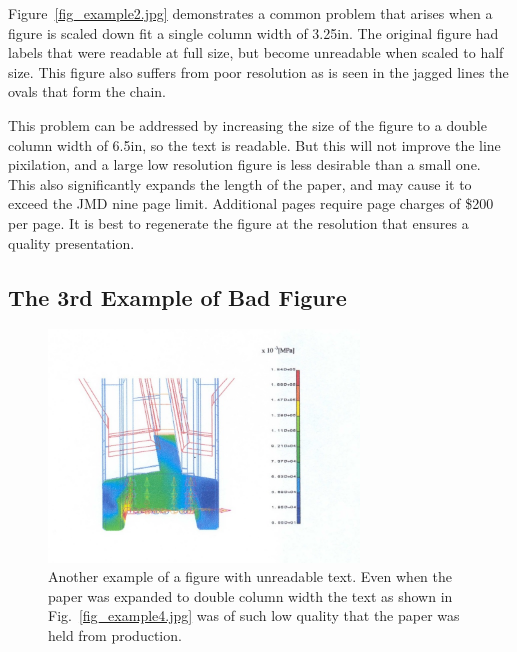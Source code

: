 \documentclass[10pt,cleanfoot]{asme2ej}
\begin{document}
Figure~\ref{fig_example2.jpg}
demonstrates a common problem that arises when a figure is scaled down fit a single column width of 3.25in.  The original figure had labels that were readable at full size, but become unreadable when scaled to half size.  This figure also suffers from poor resolution as is seen in the jagged lines the ovals that form the chain.

This problem can be addressed by increasing the size of the figure to a double column width of 6.5in, so the text is readable.  But this will not improve the line pixilation, and a large low resolution figure is less desirable than a small one.  This also significantly expands the length of the paper, and may cause it to exceed the JMD nine page limit.  Additional pages require page charges of \$200 per page.  It is best to regenerate the figure at the resolution that ensures a quality presentation.


\subsection{The 3rd Example of Bad Figure}
\begin{figure} 
\centerline{\includegraphics[width=3.25in]{figure/FMANU_MD_04_1274_13.jpg}}
\caption{Another example of a figure with unreadable text.  Even when the paper was expanded to double column width the text as shown in Fig.~\ref{fig_example4.jpg} was of such low quality that the paper was held from production.}
\label{fig_example3.jpg}
\end{figure}
\end{document}
